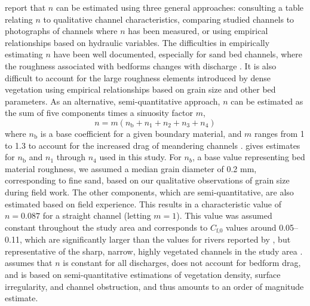 \documentclass[preprint, review, authoryear, 12pt]{elsarticle}
\begin{document}
 report that $n$ can be estimated using three general approaches: consulting a table relating $n$ to qualitative channel characteristics, comparing studied channels to photographs of channels where $n$ has been measured, or using empirical relationships based on hydraulic variables. The difficulties in empirically estimating $n$ have been well documented, especially for sand bed channels, where the roughness associated with bedforms changes with discharge \citep{Ferguson2010}. It is also difficult to account for the large roughness elements introduced by dense vegetation using empirical relationships based on grain size and other bed parameters. As an alternative, semi-quantitative approach, $n$ can be estimated as the sum of five components times a sinuosity factor $m$,
\begin{equation}\label{eq:n}
n = m(n_\text{b} + n_1 + n_2 + n_3 + n_4)
\end{equation}
where $n_\text{b}$ is a base coefficient for a given boundary material, and $m$ ranges from 1 to 1.3 to account for the increased drag of meandering channels \citep{George1989}.  gives estimates for $n_\text{b}$ and $n_1$ through $n_4$ used in this study. For $n_b$, a base value representing bed material roughness, we assumed a median grain diameter of 0.2 mm, corresponding to fine sand, based on our qualitative observations of grain size during field work. The other components, which are semi-quantitative, are also estimated based on field experience. This results in a characteristic value of $n=0.087$ for a straight channel (letting $m=1$). This value was assumed constant throughout the study area and corresponds to $C_\text{f,0}$ values around 0.05--0.11, which are significantly larger than the values for rivers reported by \citep{Ottevanger2012}, but representative of the sharp, narrow, highly vegetated channels in the study area \citep{Thorne1995}.  assumes that $n$ is constant for all discharges, does not account for bedform drag, and is based on semi-quantitative estimations of vegetation density, surface irregularity, and channel obstruction, and thus amounts to an order of magnitude estimate.
\end{document}
